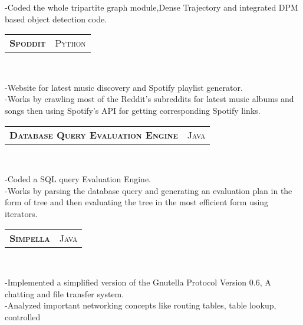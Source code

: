 \documentclass[10pt,a4paper,oneside]{article}
\begin{document}
\begin{minipage}[t]{0.63\textwidth}
\begin{adjustwidth}{7pt}{0pt}
{            -Coded the whole tripartite graph module,Dense
            Trajectory and integrated DPM based object detection code.}\\
        \end{adjustwidth}
        \begin{tabular}{c|c}
            \textbf{\normalsize S\textsc{poddit}}
            &\textmd{\normalsize P\textsc{ython}}
        \end{tabular}\\
         \vspace{-4mm}
        \begin{adjustwidth}{7pt}{0pt}
            {\footnotesize -Website for latest music
            discovery and Spotify playlist generator.\\
            -Works by crawling most of the Reddit's subreddits for
            latest music albums and songs then using Spotify's API for
            getting corresponding Spotify links.}\\
        \end{adjustwidth}
        \begin{tabular}{c|c}
            \textbf{\normalsize D\textsc{atabase} Q\textsc{uery}
            E\textsc{valuation} E\textsc{ngine}}
            &\textmd{\normalsize J\textsc{ava}}
        \end{tabular}\\
         \vspace{-4mm}
        \begin{adjustwidth}{7pt}{0pt}
            {\footnotesize -Coded a SQL query Evaluation Engine.\\
            -Works by parsing the database query and generating an evaluation plan in the form of tree and then evaluating the tree in the most efficient form using iterators.}\\
        \end{adjustwidth}
        \begin{tabular}{c|c}
            \textbf{\normalsize S\textsc{impella}}
            &\textmd{\normalsize J\textsc{ava}}
        \end{tabular}\\
         \vspace{-4mm}
        \begin{adjustwidth}{7pt}{0pt}
            {\footnotesize -Implemented a simplified version of the
            Gnutella Protocol Version 0.6, A chatting and file transfer
            system.\\
            -Analyzed important networking concepts like routing tables, table lookup, controlled
}
\end{adjustwidth}
\end{minipage}
\end{document}
